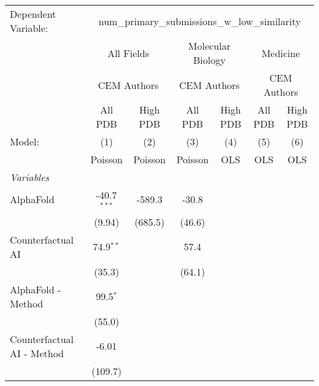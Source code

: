 \begingroup
\centering
\begin{tabular}{lcccccc}
   \tabularnewline \midrule \midrule
   Dependent Variable: & \multicolumn{6}{c}{num\_primary\_submissions\_w\_low\_similarity}\\
 & \multicolumn{2}{c}{All Fields} & \multicolumn{2}{c}{Molecular Biology} & \multicolumn{2}{c}{Medicine} \\
\cmidrule(lr){2-3} \cmidrule(lr){4-5} \cmidrule(lr){6-7}
 & \multicolumn{2}{c}{CEM Authors} & \multicolumn{2}{c}{CEM Authors} & \multicolumn{2}{c}{CEM Authors} \\
\cmidrule(lr){2-3} \cmidrule(lr){4-5} \cmidrule(lr){6-7}
 & \multicolumn{1}{c}{All PDB} & \multicolumn{1}{c}{High PDB} & \multicolumn{1}{c}{All PDB} & \multicolumn{1}{c}{High PDB} & \multicolumn{1}{c}{All PDB} & \multicolumn{1}{c}{High PDB} \\
\cmidrule(lr){2-2} \cmidrule(lr){3-3} \cmidrule(lr){4-4} \cmidrule(lr){5-5} \cmidrule(lr){6-6} \cmidrule(lr){7-7}
   Model:                                                  & (1)           & (2)     & (3)     & (4)  & (5)  & (6)\\  
                                                           &  Poisson      & Poisson & Poisson & OLS  & OLS  & OLS\\  
   \midrule
   \emph{Variables}\\
   AlphaFold                                               & -40.7$^{***}$ & -589.3  & -30.8   &      &      &   \\   
                                                           & (9.94)        & (685.5) & (46.6)  &      &      &   \\   
   Counterfactual AI                                       & 74.9$^{**}$   &         & 57.4    &      &      &   \\   
                                                           & (35.3)        &         & (64.1)  &      &      &   \\   
   AlphaFold - Method                                      & 99.5$^{*}$    &         &         &      &      &   \\   
                                                           & (55.0)        &         &         &      &      &   \\   
   Counterfactual AI - Method                              & -6.01         &         &         &      &      &   \\   
                                                           & (109.7)       &         &         &      &      &   \\   

\end{tabular}
